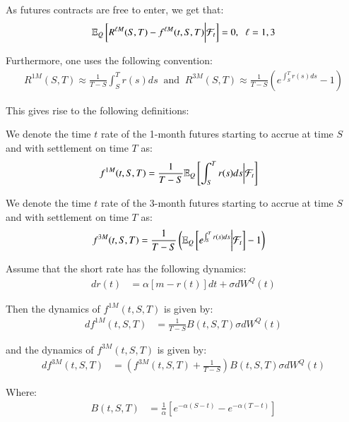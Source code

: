 As futures contracts are free to enter, we get that: 
\begin{align*}
\mathbb{E}_{Q}\left[
R^{\ell M}(S,T) - f^{\ell M}(t,S,T)\bigg{|}\mathcal{F}_{t}
\right] = 0, \;\; \ell = 1,3   
\end{align*}

Furthermore, one uses the following convention: 
\begin{align*}
R^{1M}(S,T) \approx  \frac{1}{T-S}\int_{S}^{T}r(s)ds 
\;\;\text{and}\;\;
R^{3M}(S,T) \approx  \frac{1}{T-S}\left(e^{\int_{S}^{T}r(s)ds} -1\right) 
\end{align*}

This gives rise to the following definitions:

\begin{definition}
\label{def: 1M_SOFR_futures}
We denote the time $t$ rate of the 1-month futures starting to accrue at time $S$ and with settlement on time $T$ as:
\begin{align*}
f^{1M}(t,S,T) &= \frac{1}{T-S}\mathbb{E}_{Q}\left[
\int_{S}^{T}r(s)ds\bigg{|}\mathcal{F}_{t}
\right]    
\end{align*}
\end{definition} 

\begin{definition}
\label{def: 3M_SOFR_futures}
We denote the time $t$ rate of the 3-month futures starting to accrue at time $S$ and with settlement on time $T$ as:  
\begin{align*}
f^{3M}(t,S,T) &= \frac{1}{T-S}\left(
\mathbb{E}_{Q}\left[e^{\int_{S}^{T}r(s)ds}\bigg{|}\mathcal{F}_{t}\right] - 1
\right)    
\end{align*}
\end{definition} 

\newpage 

\begin{proposition}
Assume that the short rate has the following dynamics: 
\begin{align*}
dr(t) &= \alpha[m-r(t)]dt + \sigma dW^{Q}(t)    
\end{align*}

Then the dynamics of $f^{1M}(t,S,T)$ is given by:
\begin{align*}
df^{1M}(t,S,T) &= \frac{1}{T-S}B(t,S,T)\sigma dW^{Q}(t)
\end{align*}

and the dynamics of $f^{3M}(t,S,T)$ is given by: 
\begin{align*}
df^{3M}(t,S,T) &= \left(
f^{3M}(t,S,T) +\frac{1}{T-S}
\right)B(t,S,T)\sigma dW^{Q}(t)
\end{align*}

Where: 
\begin{align*}
B(t,S,T) &= \frac{1}{\alpha}\left[
e^{-\alpha(S-t)}-e^{-\alpha(T-t)}
\right]    
\end{align*}
\end{proposition}


